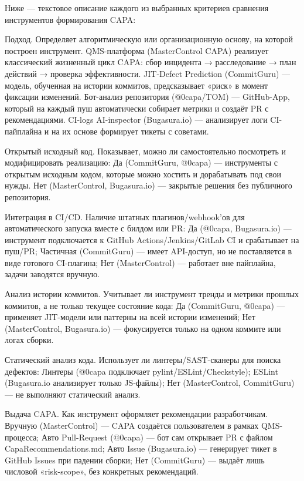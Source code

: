 Ниже — текстовое описание каждого из выбранных критериев сравнения инструментов формирования CAPA:


Подход. Определяет алгоритмическую или организационную основу, на которой построен инструмент. QMS-платформа (MasterControl CAPA) реализует классический жизненный цикл CAPA: сбор инцидента → расследование → план действий → проверка эффективности. JIT-Defect Prediction (CommitGuru) — модель, обученная на истории коммитов, предсказывает «риск» в момент фиксации изменений. Бот-анализ репозитория (@0capa/TOM) — GitHub-App, который на каждый пуш автоматически собирает метрики и создаёт PR с рекомендациями. CI-logs AI-inspector (Bugasura.io) — анализирует логи CI-пайплайна и на их основе формирует тикеты с советами.

Открытый исходный код. Показывает, можно ли самостоятельно посмотреть и модифицировать реализацию: Да (CommitGuru, @0capa) — инструменты с открытым исходным кодом, которые можно хостить и дорабатывать под свои нужды. Нет (MasterControl, Bugasura.io) — закрытые решения без публичного репозитория.

Интеграция в CI/CD. Наличие штатных плагинов/webhook’ов для автоматического запуска вместе с билдом или PR: Да (@0capa, Bugasura.io) — инструмент подключается к GitHub Actions/Jenkins/GitLab CI и срабатывает на пуш/PR; Частичная (CommitGuru) — имеет API-доступ, но не поставляется в виде готового CI-плагина; Нет (MasterControl) — работает вне пайплайна, задачи заводятся вручную.

Анализ истории коммитов. Учитывает ли инструмент тренды и метрики прошлых коммитов, а не только текущее состояние кода: Да (CommitGuru, @0capa) — применяет JIT-модели или паттерны на всей истории изменений; Нет (MasterControl, Bugasura.io) — фокусируется только на одном коммите или логах сборки.

Статический анализ кода. Использует ли линтеры/SAST-сканеры для поиска дефектов: Линтеры (@0capa подключает pylint/ESLint/Checkstyle); ESLint (Bugasura.io анализирует только JS-файлы); Нет (MasterControl, CommitGuru) — не выполняют статический анализ.

Выдача CAPA. Как инструмент оформляет рекомендации разработчикам. Вручную (MasterControl) — CAPA создаётся пользователем в рамках QMS-процесса; Авто Pull-Request (@0capa) — бот сам открывает PR с файлом CapaRecommendations.md; Авто Issue (Bugasura.io) — генерирует тикет в GitHub Issues при падении сборки; Нет (CommitGuru) — выдаёт лишь числовой «risk-scope», без конкретных рекомендаций.

